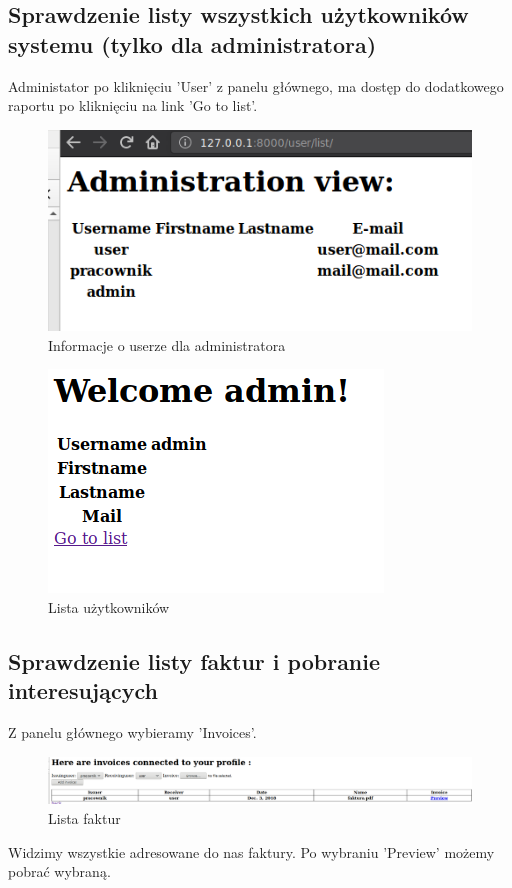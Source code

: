 \documentclass[12pt]{article}
\begin{document}
	\subsection{Sprawdzenie listy wszystkich użytkowników systemu (tylko dla administratora)}
	Administator po kliknięciu 'User' z panelu głównego, ma dostęp do dodatkowego raportu po kliknięciu na link 'Go to list'.
	\begin{figure}[H]
		\centering
		\includegraphics[scale=0.7]{img/16.png}
		\caption{Informacje o userze dla administratora}
	\end{figure}
	\begin{figure}[H]
		\centering
		\includegraphics[scale=0.7]{img/15.png}
		\caption{Lista użytkowników}
	\end{figure}
	\subsection{Sprawdzenie listy faktur i pobranie interesujących}
	Z panelu głównego wybieramy 'Invoices'.
	\begin{figure}[H]
		\centering
		\includegraphics[scale=0.3]{img/8.png}
		\caption{Lista faktur}
	\end{figure}
	Widzimy wszystkie adresowane do nas faktury. Po wybraniu 'Preview' możemy pobrać wybraną.
	
\end{document}
